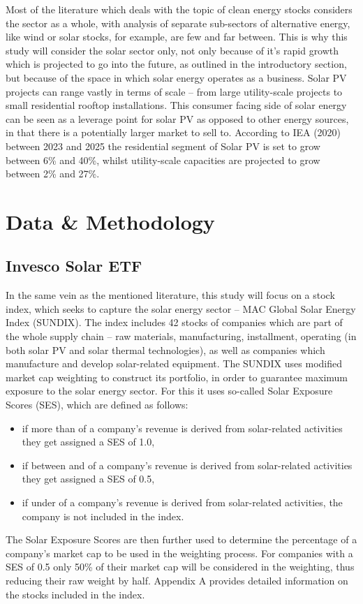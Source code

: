 \documentclass[11pt]{article}
\begin{document}
Most of the literature which deals with the topic of clean energy stocks considers the sector as a whole, with analysis of separate sub-sectors of alternative energy, like wind or solar stocks, for example, are few and far between. This is why this study will consider the solar sector only, not only because of it's rapid growth which is projected to go into the future, as outlined in the introductory section, but because of the space in which solar energy operates as a business. Solar PV projects can range vastly in terms of scale -- from large utility-scale projects to small residential rooftop installations. This consumer facing side of solar energy can be seen as a leverage point for solar PV as opposed to other energy sources, in that there is a potentially larger market to sell to. According to IEA (2020) between 2023 and 2025 the residential segment of Solar PV is set to grow between 6\% and 40\%, whilst utility-scale capacities are projected to grow between 2\% and 27\%.

\newpage
\section{Data \& Methodology}
\subsection{Invesco Solar ETF}
In the same vein as the mentioned literature, this study will focus on a stock index, which seeks to capture the solar energy sector -- MAC Global Solar Energy Index (SUNDIX). The index includes 42 stocks of companies which are part of the whole supply chain -- raw materials, manufacturing, installment, operating (in both solar PV and solar thermal technologies), as well as companies which manufacture and develop solar-related equipment. The SUNDIX uses modified market cap weighting to construct its portfolio, in order to guarantee maximum exposure to the solar energy sector. For this it uses so-called Solar Exposure Scores (SES), which are defined as follows: 
\begin{itemize}
    \item if more than  of a company's revenue is derived from solar-related activities they get assigned a SES of 1.0,
    \item if between  and  of a company's revenue is derived from solar-related activities they get assigned a SES of 0.5,
    \item if under  of a company's revenue is derived from solar-related activities, the company is not included in the index.
\end{itemize}
The Solar Exposure Scores are then further used to determine the percentage of a company's market cap to be used in the weighting process. For companies with a SES of 0.5 only 50\% of their market cap will be considered in the weighting, thus reducing their raw weight by half. Appendix A provides detailed information on the stocks included in the index.
\newline
\end{document}
